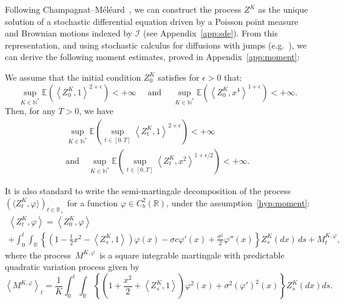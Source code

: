 \documentclass[AHL,Unicode,longabstracts,published]{cedram}
\newcommand{\Io}{\mathcal{I}}
\newcommand*\N{\mathbb{N}}
\newcommand*\R{\mathbb{R}}
\newcommand*\E{\mathbb{E}}
\begin{document}
Following Champagnat--Méléard~\cite{champagnatmeleard}, we can construct the process $Z^K$ as the unique solution of a stochastic differential equation driven by a Poisson point measure and Brownian motions indexed by $\Io$ (see Appendix~\ref{app:sde}). From this representation, and using stochastic calculus for diffusions with jumps (e.g.~\cite{ikedawatanabe}), we can derive the following moment estimates, proved in Appendix~\ref{app:moment}:
\begin{lemm}\label{lem:propagation-moment}
We assume that the initial condition $Z^{K}_{0}$ satisfies for $\epsilon>0$ that:
\begin{equation}\label{hyp:moment}
\sup_{K \in \N^*}\E\left(\left\langle Z^K_0,1\right\rangle^{2+\epsilon} \right)<+\infty\quad \text{ and }\quad \sup_{K \in \N^*} \E\left(\left\langle Z^K_0,x^4\right\rangle^{1+\epsilon}\right)<+\infty.
\end{equation}
Then, for any $T>0$, we have
\begin{multline}\label{eq:propagation}
\sup_{K \in \N^*} \E\left(\sup_{t \in [0, T]} \left\langle Z^K_t,1\right\rangle^{2+\epsilon}\right)<+\infty\\
\text{and}\quad
\sup_{K \in \N^*} \E\left(\sup_{t \in [0, T]} \left\langle Z^K_t,x^2\right\rangle^{1+\epsilon/2}\right)<+\infty.
\end{multline}
\end{lemm}


It is also standard to write the semi-martingale decomposition of the process $(\langle Z^K_t,\varphi\rangle)_{t \in \R_+}$ for a function $\varphi\in C^2_b(\R)$, under the assumption~\eqref{hyp:moment}:
\begin{multline}\label{process-moving}
\left\langle Z^{K}_{t},\varphi\right\rangle=\left\langle Z^{K}_0,\varphi\right\rangle\\
+\int_{0}^{t} \int_{\R} \left\{ \left(1-\frac{1}{2}x^2-\left\langle Z^{K}_{s}, 1\right\rangle\right)\varphi(x)-\sigma c \varphi'(x)+\frac{\sigma^2}{2}\varphi''(x)\right\} Z^{K}_{s}(dx)\, ds+M^{K, \varphi}_{t},
\end{multline}
where the process $\,M^{K, \varphi}\,$ is a square integrable martingale with predictable quadratic variation process given by
\begin{equation}\label{qv}
\left\langle M^{K, \varphi} \right\rangle_{t} = \frac{1}{K} \int_{0}^t \int_{\R} \left\{ \left(1+\frac{x^2}{2} + \left\langle Z^{K}_{s}, 1\right\rangle\right)\varphi^2(x) + {\sigma^2} (\varphi')^2(x)\right\} Z^{K}_{s}(dx) ds.
\end{equation}
\end{document}
